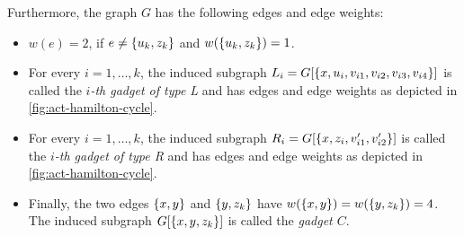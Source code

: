 Furthermore, the graph $G$ has the following edges and edge weights:
\begin{itemize}
\item {} $w(e) = 2$, if $e \neq \{ u_k, z_k \}$ and $w(\{ u_k, z_k \}) = 1$.
\item For every $i = 1,\dots,k$, the induced subgraph $L_i = G[\{ x, u_i, v_{i1}, v_{i2}, v_{i3}, v_{i4} \}]$ 
is called the \emph{$i$-th gadget of type L} and has edges and edge weights as depicted in \cref{fig:act-hamilton-cycle}.
\item For every $i = 1,\dots,k$, the induced subgraph $R_i = G[\{ x, z_i, v'_{i1}, v'_{i2} \}]$ is called the 
\emph{$i$-th gadget of type R} and has edges and edge weights as depicted in \cref{fig:act-hamilton-cycle}.
\item Finally, the two edges $\{ x,y \}$ and $\{ y, z_k \}$ have $w(\{ x,y \}) = w(\{ y, z_k \}) = 4$. The induced subgraph $G[\{ x,y,z_k \}]$ is called the \emph{gadget $C$}.
\end{itemize}

